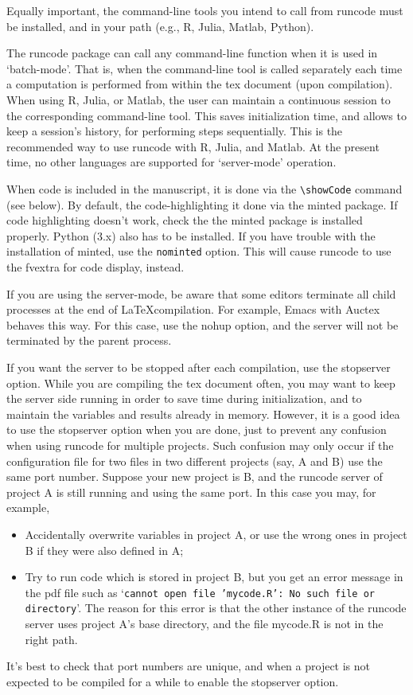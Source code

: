 \documentclass[a4paper,10pt]{article}
\begin{document}
Equally important, the command-line tools you intend to call from runcode must be installed, and in your path (e.g., R, Julia, Matlab, Python).

The runcode package can call any command-line function when it is used in `batch-mode'. That is, when the command-line tool is called separately each time a computation is performed from within the tex document (upon compilation). When using R, Julia, or Matlab, the user can maintain a continuous session to the corresponding command-line tool. This saves initialization time, and allows to keep a session's history, for performing steps sequentially. This is the recommended way to use runcode with R, Julia, and Matlab.
At the present time, no other languages are supported for `server-mode' operation.

When code is included in the manuscript, it is done via the \verb|\showCode| command (see below). By default, the code-highlighting it done via the minted package. If code highlighting doesn't work, check the the minted package is installed properly. Python (3.x) also has to be installed. If you have trouble with the installation of minted, use the \verb|nominted| option. This will cause runcode to use the fvextra for code display, instead.

If you are using the server-mode, be aware that some editors terminate all child processes at the end of \LaTeX compilation. For example, Emacs with Auctex behaves this way. For this case, use the nohup option, and the server will not be terminated by the parent process.

If you want the server to be stopped after each compilation, use the stopserver option. While you are compiling the tex document often, you may want to keep the server side running in order to save time during initialization, and to maintain the variables and results already in memory. However, it is a good idea to use the stopserver option when you are done, just to prevent any confusion when using runcode for multiple projects. Such confusion may only occur if the configuration file for two files in two different projects (say, A and B) use the same port number. Suppose your new project is B, and the runcode server of project A is still running and using the same port. In this case you may, for example,
\begin{itemize}
\item Accidentally overwrite variables in project A, or use the wrong ones in project B if they were also defined in A;
\item Try to run code which is stored in project B, but you get an error message in the pdf file such as `\texttt{cannot open file 'mycode.R': No such file or directory}'.   The reason for this error is that the other instance of the runcode server uses project A's base directory, and the file mycode.R is not in the right path.
\end{itemize}
It's best to check that port numbers are unique, and when a project is not expected to be compiled for a while to enable the stopserver option. 
\end{document}
